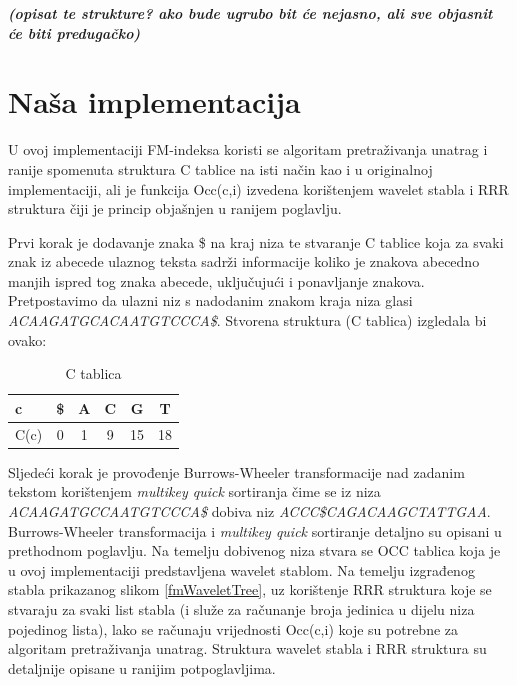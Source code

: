 \emph{\textbf{(opisat te strukture? ako bude ugrubo bit će nejasno, ali sve objasnit će biti predugačko)}}


\section{Naša implementacija}
U ovoj implementaciji FM-indeksa koristi se algoritam pretraživanja unatrag i ranije spomenuta struktura C tablice na isti način kao i u originalnoj implementaciji, ali je funkcija Occ(c,i) izvedena korištenjem wavelet stabla i RRR struktura čiji je princip objašnjen u ranijem poglavlju.

Prvi korak je dodavanje znaka \$ na kraj niza te stvaranje C tablice koja za svaki znak iz abecede ulaznog teksta sadrži informacije koliko je znakova abecedno manjih ispred tog znaka abecede, uključujući i ponavljanje znakova. Pretpostavimo da ulazni niz s nadodanim znakom kraja niza glasi \emph{ACAAGATGCACAATGTCCCA\$}. Stvorena struktura (C tablica) izgledala bi ovako:

\begin{table}[htb]
\caption{C tablica}
\label{tbl:ctabl}
\centering
\begin{tabular}{|l||ccccc|} \hline
c & \$ & A & C & G & T \\ \hline
C(c) & 0 & 1 & 9 & 15 & 18 \\ \hline
\end{tabular}
\end{table}


Sljedeći korak je provođenje Burrows-Wheeler transformacije nad zadanim tekstom korištenjem \emph{multikey quick} sortiranja čime se iz niza \emph{ACAAGATGCCAATGTCCCA\$} dobiva niz \linebreak \emph{ACCC\$CAGACAAGCTATTGAA}. Burrows-Wheeler transformacija i \emph{multikey quick} sortiranje detaljno su opisani u prethodnom poglavlju.
Na temelju dobivenog niza  stvara se OCC tablica koja je u ovoj implementaciji predstavljena wavelet stablom. Na temelju izgrađenog stabla prikazanog slikom  \ref{fmWaveletTree}, uz korištenje RRR struktura koje se stvaraju za svaki list stabla (i služe za računanje broja jedinica u dijelu niza pojedinog lista), lako se računaju  vrijednosti Occ(c,i) koje su potrebne za algoritam pretraživanja unatrag. Struktura wavelet stabla i RRR struktura su detaljnije opisane u ranijim potpoglavljima. 



